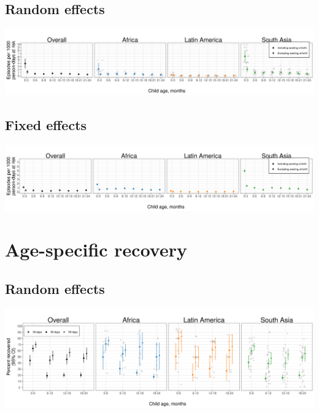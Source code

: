 \documentclass[
  9pt,
]{book}
\begin{document}
\hypertarget{random-effects-2}{%
\subsection{Random effects}\label{random-effects-2}}

\includegraphics[width=58.33in]{figures/wasting/fig-wast-2-ir-overall_region--allage-primary}

\hypertarget{fixed-effects-3}{%
\subsection{Fixed effects}\label{fixed-effects-3}}

\includegraphics[width=58.33in]{figures/wasting/FE/fig-wast-2-ir-overall_region--allage-primary_FE}

\hypertarget{age-specific-recovery}{%
\section{Age-specific recovery}\label{age-specific-recovery}}

\hypertarget{random-effects-3}{%
\subsection{Random effects}\label{random-effects-3}}

\includegraphics[width=58.33in]{figures/wasting/fig-wast-2-rec-overall_region--allage-primary}
\end{document}
